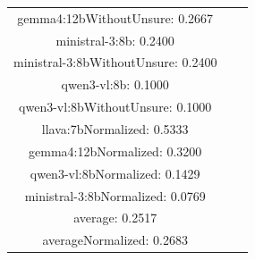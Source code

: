\documentclass[a4paper]{article}
\begin{document}
\begin{tabular}{ccc}
gemma4:12bWithoutUnsure: 0.2667 \\ ministral-3:8b: 0.2400 \\ ministral-3:8bWithoutUnsure: 0.2400 \\ qwen3-vl:8b: 0.1000 \\ qwen3-vl:8bWithoutUnsure: 0.1000 \\ llava:7bNormalized: 0.5333 \\ gemma4:12bNormalized: 0.3200 \\ qwen3-vl:8bNormalized: 0.1429 \\ ministral-3:8bNormalized: 0.0769 \\ average: 0.2517 \\ averageNormalized: 0.2683 \end{minipage}\\
\end{tabular}

\vspace{5mm}
\end{document}

